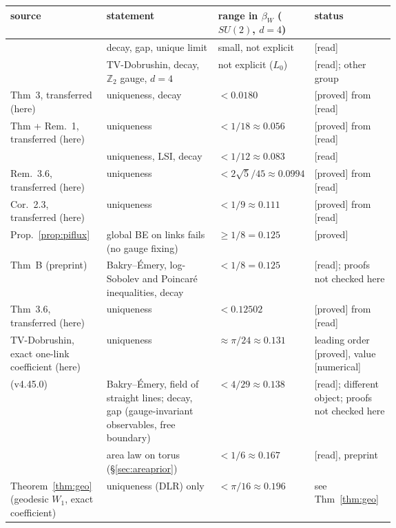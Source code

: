 \documentclass[11pt,a4paper]{article}
\theoremstyle{remark}
\theoremstyle{definition}
\theoremstyle{plain}
\theoremstyle{remark}
\newcommand{\st}[1]{\textsf{[#1]}}
\begin{document}
\begin{table}[htbp]
\centering\small
\begin{tabularx}{\linewidth}{@{}>{\raggedright\arraybackslash}p{0.25\linewidth}>{\raggedright\arraybackslash}X>{\raggedright\arraybackslash}p{0.19\linewidth}>{\raggedright\arraybackslash}p{0.21\linewidth}@{}}
\toprule
source & statement & range in $\beta_W$ ($SU(2)$, $d=4$) & status\\
\midrule
\cite{OS78} & decay, gap, unique limit & small, not explicit & \st{read}\\
\cite{Cha20} & TV-Dobrushin, decay, $\mathbb Z_2$ gauge, $d=4$ & not explicit ($L_0$) & \st{read}; other group\\
\cite{Gro79} Thm~3, transferred (here) & uniqueness, decay & $<0.0180$ & \st{proved} from \st{read}\\
\cite{Sim79} Thm + Rem.~1, transferred (here) & uniqueness & $<1/18\approx0.056$ & \st{proved} from \st{read}\\
\cite{SZZ23} & uniqueness, LSI, decay & $<1/12\approx0.083$ & \st{read}\\
\cite{Lev80} Rem.~3.6, transferred (here) & uniqueness & $<2\sqrt5/45\approx0.0994$ & \st{proved} from \st{read}\\
\cite{Roy86} Cor.~2.3, transferred (here) & uniqueness & $<1/9\approx0.111$ & \st{proved} from \st{read}\\
Prop.~\ref{prop:piflux} & global BE on links fails (no gauge fixing) & $\ge1/8=0.125$ & \st{proved}\\
\cite{BB26} Thm~B (preprint) & Bakry--\'Emery, log-Sobolev and Poincar\'e inequalities, decay & $<1/8=0.125$ & \st{read}; proofs not checked here\\
\cite{Roy86} Thm~3.6, transferred (here) & uniqueness & $<0.12502$ & \st{proved} from \st{read}\\
TV-Dobrushin, exact one-link coefficient (here) & uniqueness & $\approx\pi/24\approx0.131$ & leading order \st{proved}, value \st{numerical}\\
\cite[Thm~A]{BB26e} (v4.45.0) & Bakry--\'Emery, field of straight lines; decay, gap (gauge-invariant observables, free boundary) & $<4/29\approx0.138$ & \st{read}; different object; proofs not checked here\\
\cite{CNS25} & area law on torus (\S\ref{sec:areaprior}) & $<1/6\approx0.167$ & \st{read}, preprint\\
Theorem~\ref{thm:geo} (geodesic $W_1$, exact coefficient) & uniqueness (DLR) only & $<\pi/16\approx0.196$ & see Thm~\ref{thm:geo}\\

\end{tabularx}
\end{table}
\end{document}
